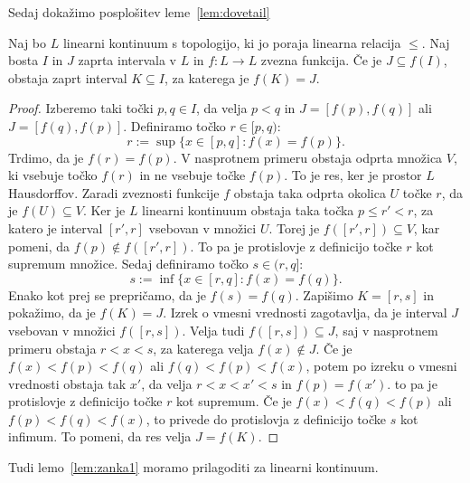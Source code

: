 \documentclass[../TG_magistrsko_delo_sections.tex]{subfiles}
\begin{document}
Sedaj dokažimo posplošitev leme~\ref{lem:dovetail}

\begin{lema}\label{lem:K}
Naj bo $L$ linearni kontinuum s topologijo, ki jo poraja linearna relacija $\leq$. Naj bosta $I$ in $J$ zaprta intervala v $L$ in $f:L \to L$ zvezna funkcija. Če je $J \subseteq f(I)$, obstaja zaprt interval $K \subseteq I$, za katerega je $f(K) = J$.
\end{lema}
\begin{proof}
Izberemo taki točki $p, q \in I$, da velja $p<q$ in $J=[f(p), f(q)]$ ali $J=[f(q), f(p)]$. Definiramo točko $r \in [p, q)$:
$$r:= \sup\{x \in [p, q] : f(x) = f(p)\}.$$
Trdimo, da je $f(r) = f(p)$. V nasprotnem primeru obstaja odprta množica $V$, ki vsebuje točko $f(r)$ in ne vsebuje točke $f(p)$. To je res, ker je prostor $L$ Hausdorffov. Zaradi zveznosti funkcije $f$ obstaja taka odprta okolica $U$ točke $r$, da je $f(U) \subseteq V$. Ker je $L$ linearni kontinuum obstaja taka točka $p \leq r' < r$, za katero je interval $[r', r]$ vsebovan v množici $U$. Torej je $f([r', r]) \subseteq V$, kar pomeni, da $f(p) \notin f([r', r])$. To pa je protislovje z definicijo točke $r$ kot supremum množice.
Sedaj definiramo točko $s \in (r, q]$:
$$s:= \inf\{x \in [r, q] : f(x) = f(q)\}.$$ 
Enako kot prej se prepričamo, da je $f(s) = f(q)$. Zapišimo $K = [r, s]$ in pokažimo, da je $f(K) = J$. Izrek o vmesni vrednosti zagotavlja, da je interval $J$ vsebovan v množici $f([r, s])$. Velja tudi $f([r, s]) \subseteq J$, saj v nasprotnem primeru obstaja $r<x<s$, za katerega velja $f(x) \notin J$. Če je $f(x) < f(p) < f(q)$ ali $f(q) < f(p) < f(x)$, potem po izreku o vmesni vrednosti obstaja tak $x'$, da velja $r<x<x'<s$ in $f(p) = f(x')$. to pa je protislovje z definicijo točke $r$ kot supremum. Če je $f(x) < f(q) < f(p)$ ali $f(p) < f(q) < f(x)$, to privede do protislovja z definicijo točke $s$ kot infimum. To pomeni, da res velja $J = f(K)$.
\end{proof}

Tudi lemo~\ref{lem:zanka1} moramo prilagoditi za linearni kontinuum.
\end{document}
